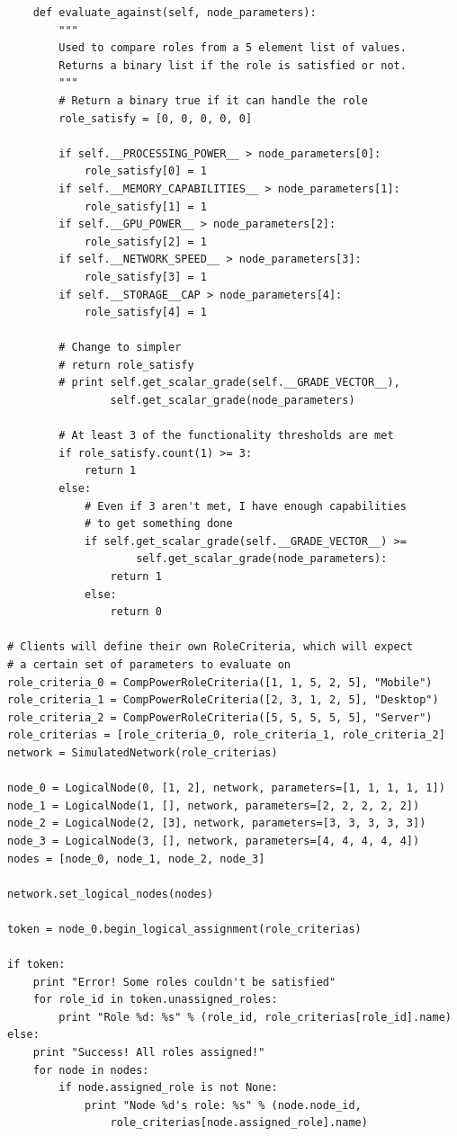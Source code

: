 \documentclass[11pt]{article}
\begin{document}
\begin{lstlisting}
    def evaluate_against(self, node_parameters):
        """
        Used to compare roles from a 5 element list of values.
        Returns a binary list if the role is satisfied or not.
        """
        # Return a binary true if it can handle the role
        role_satisfy = [0, 0, 0, 0, 0]

        if self.__PROCESSING_POWER__ > node_parameters[0]:
            role_satisfy[0] = 1
        if self.__MEMORY_CAPABILITIES__ > node_parameters[1]:
            role_satisfy[1] = 1
        if self.__GPU_POWER__ > node_parameters[2]:
            role_satisfy[2] = 1
        if self.__NETWORK_SPEED__ > node_parameters[3]:
            role_satisfy[3] = 1
        if self.__STORAGE__CAP > node_parameters[4]:
            role_satisfy[4] = 1

        # Change to simpler
        # return role_satisfy
        # print self.get_scalar_grade(self.__GRADE_VECTOR__),
        		self.get_scalar_grade(node_parameters)

        # At least 3 of the functionality thresholds are met
        if role_satisfy.count(1) >= 3:
            return 1
        else:
            # Even if 3 aren't met, I have enough capabilities
            # to get something done
            if self.get_scalar_grade(self.__GRADE_VECTOR__) >=
            		self.get_scalar_grade(node_parameters):
                return 1
            else:
                return 0

# Clients will define their own RoleCriteria, which will expect
# a certain set of parameters to evaluate on
role_criteria_0 = CompPowerRoleCriteria([1, 1, 5, 2, 5], "Mobile")
role_criteria_1 = CompPowerRoleCriteria([2, 3, 1, 2, 5], "Desktop")
role_criteria_2 = CompPowerRoleCriteria([5, 5, 5, 5, 5], "Server")
role_criterias = [role_criteria_0, role_criteria_1, role_criteria_2]
network = SimulatedNetwork(role_criterias)

node_0 = LogicalNode(0, [1, 2], network, parameters=[1, 1, 1, 1, 1])
node_1 = LogicalNode(1, [], network, parameters=[2, 2, 2, 2, 2])
node_2 = LogicalNode(2, [3], network, parameters=[3, 3, 3, 3, 3])
node_3 = LogicalNode(3, [], network, parameters=[4, 4, 4, 4, 4])
nodes = [node_0, node_1, node_2, node_3]

network.set_logical_nodes(nodes)

token = node_0.begin_logical_assignment(role_criterias)

if token:
    print "Error! Some roles couldn't be satisfied"
    for role_id in token.unassigned_roles:
        print "Role %d: %s" % (role_id, role_criterias[role_id].name)
else:
    print "Success! All roles assigned!"
    for node in nodes:
        if node.assigned_role is not None:
            print "Node %d's role: %s" % (node.node_id,
            	role_criterias[node.assigned_role].name)

\end{lstlisting}
\end{document}
